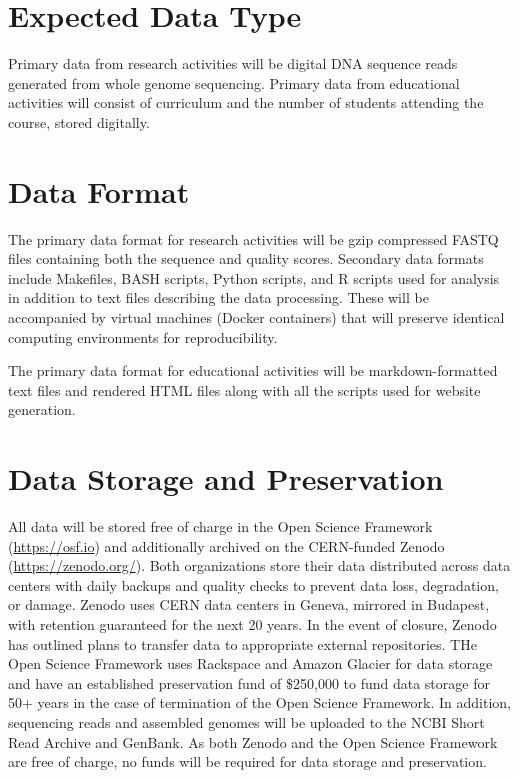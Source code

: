 \documentclass[12pt,letterpaper]{article}
\title{\ruleline{Data Management Plan}}
\begin{document}
\maketitle

\section{Expected Data Type}

Primary data from research activities will be digital DNA sequence reads generated from whole genome sequencing. Primary data from educational activities will consist of curriculum and the number of students attending the course, stored digitally. 

\section{Data Format}

The primary data format for research activities will be gzip compressed FASTQ files containing both the sequence and quality scores. Secondary data formats include Makefiles, BASH scripts, Python scripts, and R scripts used for analysis in addition to text files describing the data processing.
These will be accompanied by virtual machines (Docker containers) that will preserve identical computing environments for reproducibility. 

The primary data format for educational activities will be markdown-formatted text files and rendered HTML files along with all the scripts used for website generation. 

\section{Data Storage and Preservation}


All data will be stored free of charge in the Open Science Framework (\url{https://osf.io}) and additionally archived on the CERN-funded Zenodo (\url{https://zenodo.org/}). 
Both organizations store their data distributed across data centers with daily backups and quality checks to prevent data loss, degradation, or damage.
Zenodo uses CERN data centers in Geneva, mirrored in Budapest, with retention guaranteed for the next 20 years. 
In the event of closure, Zenodo has outlined plans to transfer data to appropriate external repositories.
THe Open Science Framework uses Rackspace and Amazon Glacier for data storage and have an established preservation fund of \$250,000 to fund data storage for 50+ years in the case of termination of the Open Science Framework. 
In addition, sequencing reads and assembled genomes will be uploaded to the NCBI Short Read Archive and GenBank. 
As both Zenodo and the Open Science Framework are free of charge, no funds will be required for data storage and preservation.
\end{document}
